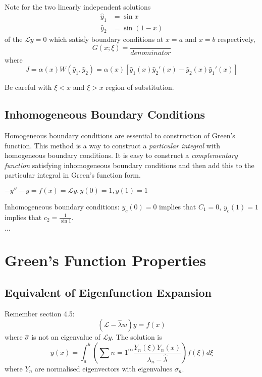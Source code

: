 \documentclass[a4paper]{article}
\renewcommand*\L{\mathcal{L}}
\begin{document}
Note for the two linearly independent solutions
\begin{align*}
  \hat y_1 &= \sin x \\
  \hat y_2 &= \sin (1 - x)
\end{align*}
of the \(\L y = 0\) which satisfy boundary conditions at \(x = a\) and \(x = b\) respectively,
\[
  G(x; \xi) = \frac{}{denominator}
\]
where
\[
  J = \alpha(x) W(\hat y_1, \hat y_2) = \alpha(x) [\hat y_1(x) \hat y_2'(x) - \hat y_2(x) \hat y_1'(x) ]
\]

\begin{note}
  Be careful with \(\xi < x\) and \(\xi > x\) region of substitution.
\end{note}

\subsection{Inhomogeneous Boundary Conditions}

Homogeneous boundary conditions are essential to construction of Green's function. This method is a way to construct a \emph{particular integral} with homogeneous boundary conditions. It is easy to construct a \emph{complementary function} satisfying inhomogeneous boundary conditions and then add this to the particular integral in Green's function form.

\begin{eg}
  \(-y'' - y = f(x) = \L y, y(0) = 1, y(1) = 1\)

  Inhomogeneous boundary conditions: \(y_c(0) = 0\) implies that \(C_1 = 0\), \(y_c(1) = 1\) implies that \(c_2 = \frac{1}{\sin 1}\).

   \(\dots\)
\end{eg}

\section{Green's Function Properties}

\subsection{Equivalent of Eigenfunction Expansion}

Remember section 4.5:
\[
  (\L - \hat \lambda w) y = f(x)
\]
where \(\hat \sigma\) is not an eigenvalue of \(\L y\). The solution is
\[
  y(x) = \int_{a}^{b} \left( \sum{n = 1}^\infty \frac{Y_n(\xi)Y_n(x)}{\lambda_n - \hat \lambda} \right) f(\xi) d\xi
\]
where \(Y_n\) are normalised eigenvectors with eigenvalues \(\sigma_n\).
\end{document}
